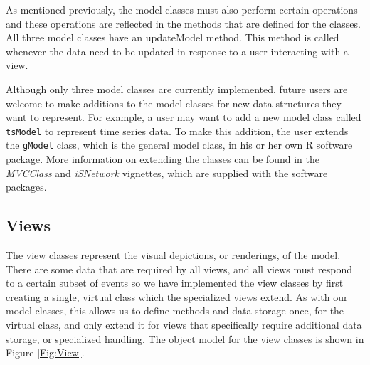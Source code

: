 \documentclass[11pt]{article}
\newcommand{\Rfunction}[1]{{\textsf{#1}}}
\newcommand{\Rpackage}[1]{{\textit{#1}}}
\newcommand{\Rslot}[1]{\textsl{#1}}
\newcommand{\Rclass}[1]{\texttt{#1}}
\begin{document}

As mentioned previously, the model classes must also perform certain
operations and these operations are reflected in the methods that are
defined for the classes.  All three model classes have an
\Rfunction{updateModel} method.  This method is called whenever the
data need to be updated in response to a user interacting with a view.

Although only three model classes are currently implemented, future
users are welcome to make additions to the model classes for new data
structures they want to represent.  For example, a user may want to add a new
model class called \Rclass{tsModel} to represent time series data.
To make this addition, the user extends the \Rclass{gModel} class, which is
the general model class, in his or
her own R software package.  More information on extending the classes can be
found in the \Rpackage{MVCClass} and \Rpackage{iSNetwork} vignettes, which are
supplied with the software packages.

\subsection{Views}\label{Ssec:OneViews}

The view classes represent the visual depictions, or renderings, of
the model.  There are some data that are required by all views, and all views
must respond to a certain subset of events so we have implemented the view
classes by first creating a single, virtual class which the specialized
views extend.  As with our model classes, this allows us to define
methods and data storage once, for the virtual class, and only extend
it for views that specifically require additional data storage, or
specialized handling.  The object model for the view classes is shown
in Figure \ref{Fig:View}.
\end{document}
